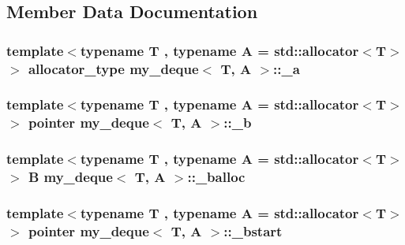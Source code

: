 \subsection{Member Data Documentation}
\hypertarget{classmy__deque_ab2ba2e14114a27b2f91e47dfccabc639}{
\subsubsection[{\-\_\-a}]{\setlength{\rightskip}{0pt plus 5cm}template$<$typename T , typename A  = std\-::allocator$<$\-T$>$$>$ {\bf allocator\-\_\-type} {\bf my\-\_\-deque}$<$ T, A $>$\-::\-\_\-a\hspace{0.3cm}{\ttfamily [private]}}}\label{classmy__deque_ab2ba2e14114a27b2f91e47dfccabc639}
\hypertarget{classmy__deque_aaa73de3a597f551851ec4a79c7100dac}{
\subsubsection[{\-\_\-b}]{\setlength{\rightskip}{0pt plus 5cm}template$<$typename T , typename A  = std\-::allocator$<$\-T$>$$>$ {\bf pointer} {\bf my\-\_\-deque}$<$ T, A $>$\-::\-\_\-b\hspace{0.3cm}{\ttfamily [private]}}}\label{classmy__deque_aaa73de3a597f551851ec4a79c7100dac}
\hypertarget{classmy__deque_aff09be5225ab5c67ce40d4876a3afbe7}{
\subsubsection[{\-\_\-balloc}]{\setlength{\rightskip}{0pt plus 5cm}template$<$typename T , typename A  = std\-::allocator$<$\-T$>$$>$ {\bf B} {\bf my\-\_\-deque}$<$ T, A $>$\-::\-\_\-balloc\hspace{0.3cm}{\ttfamily [private]}}}\label{classmy__deque_aff09be5225ab5c67ce40d4876a3afbe7}
\hypertarget{classmy__deque_abb765edbf3d947df440a760c5e1eb810}{
\subsubsection[{\-\_\-bstart}]{\setlength{\rightskip}{0pt plus 5cm}template$<$typename T , typename A  = std\-::allocator$<$\-T$>$$>$ {\bf pointer} {\bf my\-\_\-deque}$<$ T, A $>$\-::\-\_\-bstart\hspace{0.3cm}{\ttfamily [private]}}}\label{classmy__deque_abb765edbf3d947df440a760c5e1eb810}

